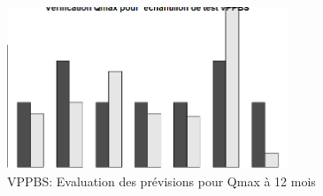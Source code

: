 \begin{figure}[H]
\centering
\includegraphics[width=0.75\textwidth]{../Fig/VPPBS/vppbs-regtree-test-qmax12.png}
\caption{VPPBS: Evaluation des prévisions pour Qmax à 12 mois}
\label{fig-vppbs-forest-test-qmax12}
\end{figure}
